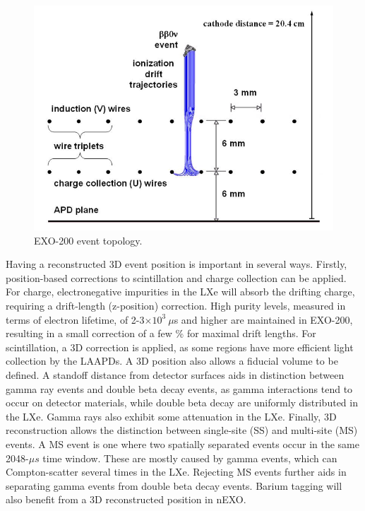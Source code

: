 \begin{figure} %
	\centering
	\includegraphics[width=.7\textwidth]{figures/anodecathodedriftcharges.png}
	\caption{EXO-200 event topology.  }
\label{fig:detectionplane}
\end{figure}

Having a reconstructed 3D event position is important in several ways.  Firstly, position-based corrections to scintillation and charge collection can be applied.  For charge, electronegative impurities in the LXe will absorb the drifting charge, requiring a drift-length (z-position) correction.  High purity levels, measured in terms of electron lifetime, of 2-3$\times 10^{3}~\mu$s and higher are maintained in EXO-200, resulting in a small correction of a few \% for maximal drift lengths.  For scintillation, a 3D correction is applied, as some regions have more efficient light collection by the LAAPDs.  A 3D position also allows a fiducial volume to be defined.  A standoff distance from detector surfaces aids in distinction between gamma ray events and double beta decay events, as gamma interactions tend to occur on detector materials, while double beta decay are uniformly distributed in the LXe.  Gamma rays also exhibit some attenuation in the LXe.  Finally, 3D reconstruction allows the distinction between single-site (SS) and multi-site (MS) events.  A MS event is one where two spatially separated events occur in the same 2048-$\mu s$ time window.  These are mostly caused by gamma events, which can Compton-scatter several times in the LXe.  Rejecting MS events further aids in separating gamma events from double beta decay events.  \cite{EXO200TwoNuLong} Barium tagging will also benefit from a 3D reconstructed position in nEXO.


